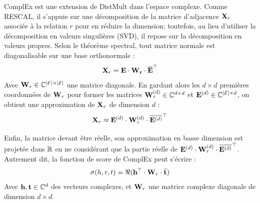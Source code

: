 ComplEx est une extension de DistMult dans l'espace complexe. Comme RESCAL, il s'appuie sur une décomposition de la matrice d'adjacence $\bf{X}_r$ associée à la relation $r$ pour en réduire la dimension; toutefois, au lieu d'utiliser la décomposition en valeurs singulières (SVD), il repose sur la décomposition en valeurs propres. Selon le théorème spectral, tout matrice normale est diagonalisable sur une base orthonormale :
\begin{equation}
    \bf{X}_r = \bf{E \cdot W_r \cdot \compconj{E}^\top}
\end{equation}
Avec $\bf{W}_r \in \mathbb{C}^{|\Ent| \times |\Ent|}$ une matrice diagonale. En gardant alors les $d \times d$ premières coordonnées de $\bf{W}_r$ pour former les matrices $\bf{W}_r^{(d)} \in \mathbb{C}^{d \times d}$ et $\bf{E}^{(d)} \in \mathbb{C}^{|\Ent| \times d}$, on obtient une approximation de $\bf{X}_r$ de dimension $d$ :
\begin{equation}
    \bf{X}_r \approx \bf{E}^{(d)} \cdot \bf{W}_r^{(d)} \cdot \compconj{ \bf{E}^{(d)}}^\top
\end{equation}

Enfin, la matrice devant être réelle, son approximation en basse dimension est projetée dans $\R$ en ne considérant que la partie réelle de $\bf{E}^{(d)} \cdot \bf{W}_r^{(d)} \cdot \compconj{ \bf{E}^{(d)}}^\top$. Autrement dit, la fonction de score de ComplEx peut s'écrire :
\begin{equation}
    \sigma(h, r, t) = \Re(\bf{h^\top \cdot W}_r \cdot \compconj{\bf{t}})
\end{equation}
Avec $\bf{h, t} \in \mathbb{C}^d$ des vecteurs complexes, et $\bf{W}_r$ une matrice complexe diagonale de dimension $d \times d$.


